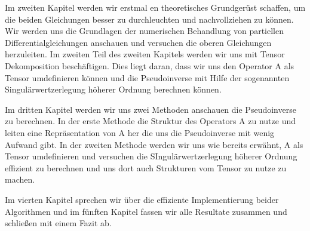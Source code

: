 Im zweiten Kapitel werden wir erstmal en theoretisches Grundgerüst schaffen, um die beiden Gleichungen besser zu durchleuchten und nachvollziehen zu können. Wir werden uns die Grundlagen der numerischen Behandlung von partiellen Differentialgleichungen anschauen und versuchen die oberen Gleichungen herzuleiten.
Im zweiten Teil des zweiten Kapitels werden wir uns mit Tensor Dekomposition beschäftigen. Dies liegt daran, dass wir uns den Operator A als Tensor umdefinieren können und die Pseudoinverse mit Hilfe der sogenannten Singulärwertzerlegung höherer Ordnung berechnen können.

Im dritten Kapitel werden wir uns zwei Methoden anschauen die Pseudoinverse zu berechnen. In der erste Methode die Struktur des Operators A zu nutze und leiten eine Repräsentation von A her die uns die Pseudoinverse mit wenig Aufwand gibt. In der zweiten Methode werden wir uns wie bereits erwähnt, A als Tensor umdefinieren und versuchen die SIngulärwertzerlegung höherer Ordnung effizient zu berechnen und uns dort auch Strukturen vom Tensor zu nutze zu machen.

Im vierten Kapitel sprechen wir über die effiziente Implementierung beider Algorithmen und im fünften Kapitel fassen wir alle Resultate zusammen und schließen mit einem Fazit ab.




